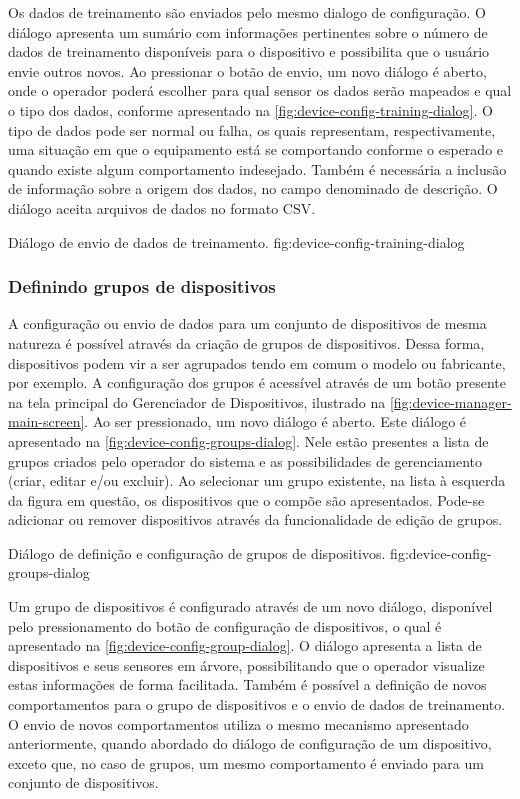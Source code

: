 Os dados de treinamento são enviados pelo mesmo dialogo de configuração. O diálogo apresenta um
sumário com informações pertinentes sobre o número de dados de treinamento disponíveis para o
dispositivo e possibilita que o usuário envie outros novos. Ao pressionar o botão de envio, um novo
diálogo é aberto, onde o operador poderá escolher para qual sensor os dados serão mapeados e qual o
tipo dos dados, conforme apresentado na \cref{fig:device-config-training-dialog}. O tipo de dados
pode ser normal ou falha, os quais representam, respectivamente, uma situação em que o equipamento
está se comportando conforme o esperado e quando existe algum comportamento indesejado. Também é
necessária a inclusão de informação sobre a origem dos dados, no campo denominado de descrição. O
diálogo aceita arquivos de dados no formato \gls{CSV}.

  {Diálogo de envio de dados de treinamento.}
  {fig:device-config-training-dialog}


\subsubsection{Definindo grupos de dispositivos}

A configuração ou envio de dados para um conjunto de dispositivos de mesma natureza é possível
através da criação de grupos de dispositivos. Dessa forma, dispositivos podem vir a ser agrupados
tendo em comum o modelo ou fabricante, por exemplo. A configuração dos grupos é acessível através de
um botão presente na tela principal do Gerenciador de Dispositivos, ilustrado na
\cref{fig:device-manager-main-screen}. Ao ser pressionado, um novo diálogo é aberto. Este diálogo é
apresentado na \cref{fig:device-config-groups-dialog}. Nele estão presentes a lista de grupos
criados pelo operador do sistema e as possibilidades de gerenciamento (criar, editar e/ou excluir).
Ao selecionar um grupo existente, na lista à esquerda da figura em questão, os dispositivos que o
compõe são apresentados. Pode-se adicionar ou remover dispositivos através da funcionalidade de
edição de grupos.

  {Diálogo de definição e configuração de grupos de dispositivos.}
  {fig:device-config-groups-dialog}

Um grupo de dispositivos é configurado através de um novo diálogo, disponível pelo pressionamento do
botão de configuração de dispositivos, o qual é apresentado na
\cref{fig:device-config-group-dialog}. O diálogo apresenta a lista de dispositivos e seus sensores
em árvore, possibilitando que o operador visualize estas informações de forma facilitada. Também é
possível a definição de novos comportamentos para o grupo de dispositivos e o envio de dados de
treinamento. O envio de novos comportamentos utiliza o mesmo mecanismo apresentado anteriormente,
quando abordado do diálogo de configuração de um dispositivo, exceto que, no caso de grupos, um
mesmo comportamento é enviado para um conjunto de dispositivos.

